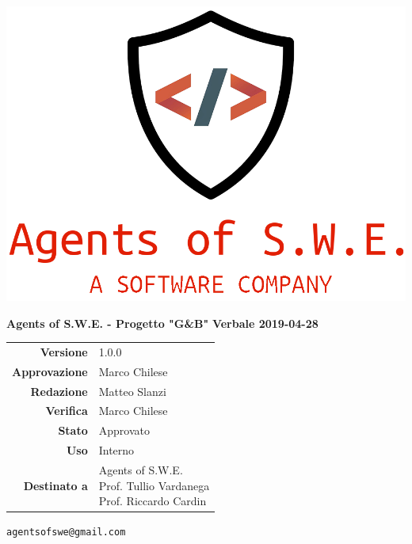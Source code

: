 


\begin{titlepage}
\thispagestyle{empty}

\begin{center}

\includegraphics[scale=0.3]{./images/logo.png} 




\large \textbf{Agents of S.W.E. - Progetto "G\&B"}
\vfill
\Huge \textbf{Verbale 2019-04-28}
\vfill
\large
\renewcommand{\arraystretch}{1.3}
\begin{tabular}{r|l}
\textbf{Versione} & 1.0.0\\
\textbf{Approvazione} & {Marco Chilese}\\
\textbf{Redazione} & \parbox[t]{5cm}{Matteo Slanzi}\\
\textbf{Verifica} & \parbox[t]{5cm}{Marco Chilese}\\
\textbf{Stato} & Approvato\\
\textbf{Uso} & Interno\\
\textbf{Destinato a} & \parbox[t]{5cm}{Agents of S.W.E. \\Prof. Tullio Vardanega\\Prof. Riccardo Cardin}
\end{tabular}
\vfill
\small
\texttt{agentsofswe@gmail.com}
\end{center}
\end{titlepage}

\pagebreak



\pagebreak


\pagebreak


\pagebreak








